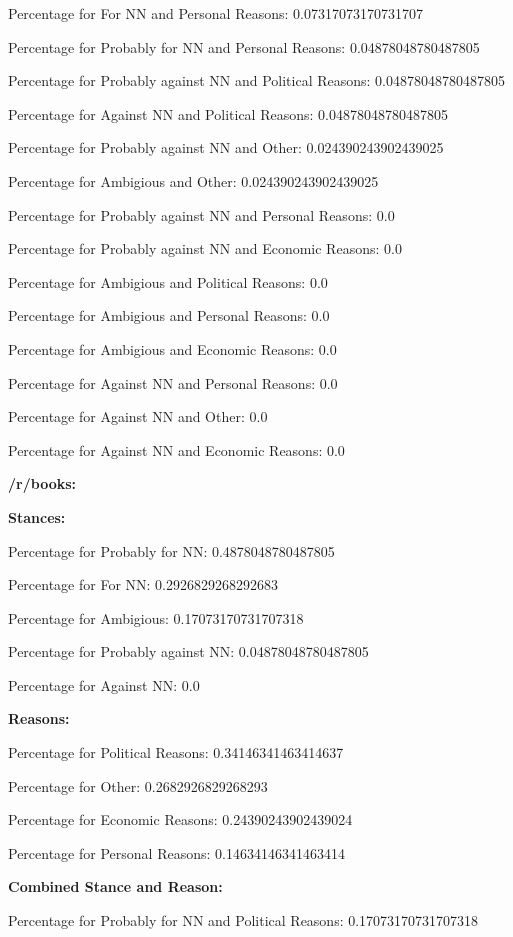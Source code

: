 \documentclass[11pt]{article}
\begin{document}
	Percentage for For NN and Personal Reasons: 0.07317073170731707
	
	Percentage for Probably for NN and Personal Reasons: 0.04878048780487805
	
	Percentage for Probably against NN and Political Reasons: 0.04878048780487805
	
	Percentage for Against NN and Political Reasons: 0.04878048780487805
	
	Percentage for Probably against NN and Other: 0.024390243902439025
	
	Percentage for Ambigious and Other: 0.024390243902439025
	
	Percentage for Probably against NN and Personal Reasons: 0.0
	
	Percentage for Probably against NN and Economic Reasons: 0.0
	
	Percentage for Ambigious and Political Reasons: 0.0
	
	Percentage for Ambigious and Personal Reasons: 0.0
	
	Percentage for Ambigious and Economic Reasons: 0.0
	
	Percentage for Against NN and Personal Reasons: 0.0
	
	Percentage for Against NN and Other: 0.0
	
	Percentage for Against NN and Economic Reasons: 0.0
	
	\textbf{/r/books:}
	
	\textbf{Stances:}
	
	Percentage for Probably for NN: 0.4878048780487805
	
	Percentage for For NN: 0.2926829268292683
	
	Percentage for Ambigious: 0.17073170731707318
	
	Percentage for Probably against NN: 0.04878048780487805
	
	Percentage for Against NN: 0.0
	
	\textbf{Reasons:}
	
	Percentage for Political Reasons: 0.34146341463414637
	
	Percentage for Other: 0.2682926829268293
	
	Percentage for Economic Reasons: 0.24390243902439024
	
	Percentage for Personal Reasons: 0.14634146341463414
	
	\textbf{Combined Stance and Reason:}
	
	Percentage for Probably for NN and Political Reasons: 0.17073170731707318
	
\end{document}
